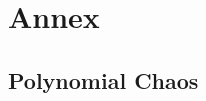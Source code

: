 \documentclass[hidelinks,12pt]{article}
\begin{document}
\section{Annex}

\subsection{Polynomial Chaos}

\subsection{}
\end{document}
